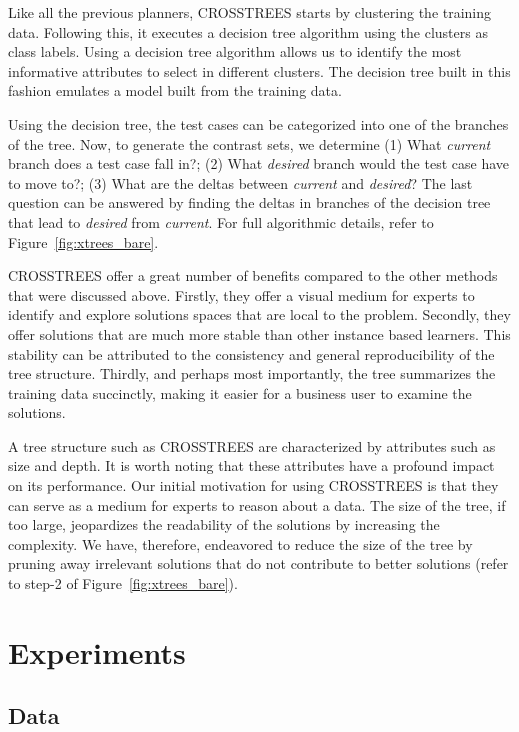 \documentclass{sig-alternate}
\newcommand{\fig}[1]{Figure~\ref{fig:#1}}
\begin{document}
Like all the previous planners, CROSSTREES starts by clustering the training data. Following this, it executes a decision tree algorithm using the clusters as class labels. Using a decision tree algorithm allows us to identify the most informative attributes to select in different clusters. The decision tree built in this fashion emulates a model built from the training data. 

Using the decision tree, the test cases can be categorized into one of the branches of the tree. Now, to generate the contrast sets, we determine (1) What \textit{current} branch does a test case fall in?; (2) What \textit{desired} branch would the test case have to move to?; (3) What are the deltas between \textit{current} and \textit{desired}? The last question can be answered by finding the deltas in branches of the decision tree that lead to \textit{desired} from \textit{current}. For full algorithmic details, refer to \fig{xtrees_bare}.

CROSSTREES offer a great number of benefits compared to the other methods that were discussed above. Firstly, they offer a visual medium for experts to identify and explore solutions spaces that are local to the problem. Secondly, they offer solutions that are much more stable than other instance based learners. This stability can be attributed to the consistency and general reproducibility of the tree structure. Thirdly, and perhaps most importantly, the tree summarizes the training data succinctly, making it easier for a business user to examine the solutions.

A tree structure such as CROSSTREES are characterized by attributes such as size and depth. It is worth noting that these attributes have a profound impact on its performance. Our initial motivation for using CROSSTREES is that they can serve as a medium for experts to reason about a data. The size of the tree, if too large, jeopardizes the readability of the solutions by increasing the complexity. We have, therefore, endeavored to reduce the size of the tree by pruning away irrelevant solutions that do not contribute to better solutions (refer to step-2 of \fig{xtrees_bare}). 


\section{Experiments}

\subsection{Data}
\end{document}
